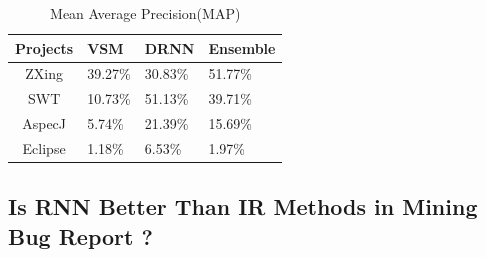  \begin{table}[h]
 	\begin{center}
 		\caption{Mean Average Precision(MAP)}
 		\label{performance_map}
 		
 		\begin{tabular}{c|l|l|l} %
 			\textbf{Projects} & \textbf{VSM} & \textbf{DRNN} & \textbf{Ensemble} \\
 			\hline\hline
 			ZXing& 39.27\%&30.83\% &51.77\%\\
 			
 			SWT & 10.73\%  & 51.13\%  & 39.71\% \\
 			
 			AspecJ &5.74\% & 21.39\% & 15.69\%\\
 			
 			Eclipse &1.18\% & 6.53\%& 1.97\% \\
 			
 		\end{tabular}
 	\end{center}
 \end{table}


\subsection{Is RNN Better Than IR Methods in Mining Bug Report ?}









	 